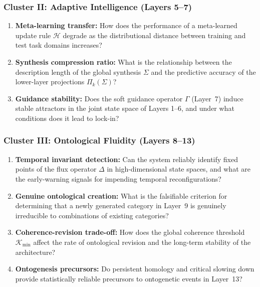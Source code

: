 \subsubsection{Cluster II: Adaptive Intelligence (Layers 5--7)}
\begin{enumerate}[label=RQ\arabic*:, leftmargin=2.5cm, resume=rq]
    \item \textbf{Meta-learning transfer:} How does the performance of a meta-learned update rule $\mathcal{H}$ degrade as the distributional distance between training and test task domains increases?
    \item \textbf{Synthesis compression ratio:} What is the relationship between the description length of the global synthesis $\Sigma$ and the predictive accuracy of the lower-layer projections $\Pi_k(\Sigma)$?
    \item \textbf{Guidance stability:} Does the soft guidance operator $\Gamma$ (Layer~7) induce stable attractors in the joint state space of Layers 1--6, and under what conditions does it lead to lock-in?
\end{enumerate}

\subsubsection{Cluster III: Ontological Fluidity (Layers 8--13)}
\begin{enumerate}[label=RQ\arabic*:, leftmargin=2.5cm, resume=rq]
    \item \textbf{Temporal invariant detection:} Can the system reliably identify fixed points of the flux operator $\Delta$ in high-dimensional state spaces, and what are the early-warning signals for impending temporal reconfigurations?
    \item \textbf{Genuine ontological creation:} What is the falsifiable criterion for determining that a newly generated category in Layer~9 is genuinely irreducible to combinations of existing categories?
    \item \textbf{Coherence-revision trade-off:} How does the global coherence threshold $\mathcal{K}_{\text{min}}$ affect the rate of ontological revision and the long-term stability of the architecture?
    \item \textbf{Ontogenesis precursors:} Do persistent homology and critical slowing down provide statistically reliable precursors to ontogenetic events in Layer~13?
\end{enumerate}

